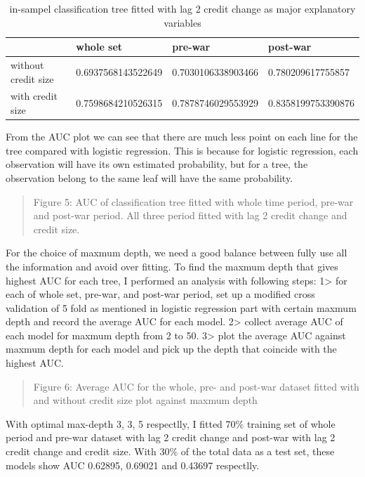 \documentclass{article}
\newcommand{\ciapdf}[1]{\vspace*{-\parskip}\begin{center}\resizebox{0.75\textwidth}{!}{\texttt{[image: \#1]}}\end{center}}
\begin{document}
\begin{table}[H]
    \caption{
    in-sampel classification tree fitted with lag 2 credit change
    as major explanatory variables
    }
    \begin{tabular}{|l|l|l|l|}
    \hline
                        & whole set          & pre-war            & post-war           \\ \hline
    without credit size & 0.6937568143522649 & 0.7030106338903466 & 0.780209617755857  \\ \hline
    with credit size    & 0.7598684210526315 & 0.7878746029553929 & 0.8358199753390876 \\ \hline
    \end{tabular}
\end{table}

From the AUC plot we can see that there are much less point on each line
for the tree compared with logistic regression. This is because for
logistic regression, each observation will have its own estimated
probability, but for a tree, the observation belong to the same leaf
will have the same probability.

\ciapdf{Figure_5.pdf}
\begin{quote}
Figure 5: AUC of classification tree fitted with whole time period,
pre-war and post-war period. All three period fitted with lag 2 credit
change and credit size.
\end{quote}

For the choice of maxmum depth, we need a good balance between fully use
all the information and avoid over fitting. To find the maxmum depth
that gives highest AUC for each tree, I performed an analysis with
following steps: 1\textgreater{} for each of whole set, pre-war, and
post-war period, set up a modified cross validation of 5 fold as
mentioned in logistic regression part with certain maxmum depth and
record the average AUC for each model. 2\textgreater{} collect average
AUC of each model for maxmum depth from 2 to 50. 3\textgreater{} plot
the average AUC against maxmum depth for each model and pick up the
depth that coincide with the highest AUC.

\ciapdf{Figure_6.pdf}
\begin{quote}
Figure 6: Average AUC for the whole, pre- and post-war dataset fitted
with and without credit size plot against maxmum depth
\end{quote}

With optimal max-depth 3, 3, 5 respectlly, I fitted 70\% training set of whole period and
pre-war dataset with lag 2 credit change and post-war with lag 2 credit
change and credit size. With 30\% of the total data as a test set, these models show AUC 0.62895,
0.69021 and 0.43697 respectlly.
\end{document}
